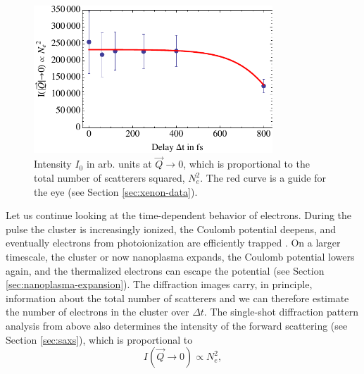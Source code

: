 \begin{figure}
	\centering
		\includegraphics[width=0.80\textwidth]{images/results/number-of-scatterers.pdf}
	\caption[Time-resolved behavior of number of scatterers due to nanoplasma expansion]{Intensity $I_{0}$ in arb. units at $\vec{Q}\rightarrow 0$, which is proportional to the total number of scatterers squared, $N_{e}^{2}$. The red curve is a guide for the eye (see Section \ref{sec:xenon-data}).}
	\label{fig:number-of-scatterer}
\end{figure}
%
Let us continue looking at the time-dependent behavior of electrons. During the pulse the cluster is increasingly ionized, the Coulomb potential deepens, and eventually electrons from photoionization are efficiently trapped \cite{Arbeiter-2011-NJP}. On a larger timescale, the cluster or now nanoplasma expands, the Coulomb potential lowers again, and the thermalized electrons can escape the potential (see Section \ref{sec:nanoplasma-expansion}). The diffraction images carry, in principle, information about the total number of scatterers and we can therefore estimate the number of electrons in the cluster over $\Delta t$. The single-shot diffraction pattern analysis from above also determines the intensity of the forward scattering (see Section \ref{sec:saxs}), which is proportional to
\begin{equation}{}
I\left(\vec{Q}\rightarrow 0\right) \propto N_{e}^{2},
\label{eq:intensity-prop-to-electrons}
\end{equation}
